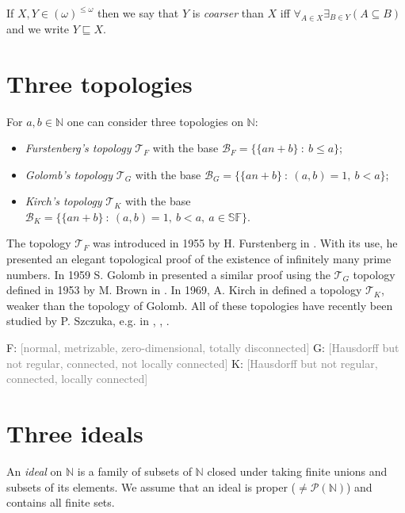 \documentclass{amsart}
\theoremstyle{definition}
\theoremstyle{definition}
\newcommand{\N}{{\mathbb N}}
\newcommand{\Z}{{\mathbb Z}}
\newcommand{\T}{\mathcal{T}}
\newcommand{\SqrFr}{\mathbb{SF}}
\newcommand{\Partitions}{(\omega)^{\leq \omega}}
\begin{document}
 If $X, Y \in \Partitions$ then we say that $Y$ is
{\it coarser} than $X$ iff
  $\forall_{A \in X} \exists_{B \in Y} (A \subseteq B)$
and we write $Y \sqsubseteq X$.



\section*{Three topologies}

For $a,b\in\N$ one can consider three topologies on $\N$:
\begin{itemize}
\item \emph{Furstenberg's topology} $\T_F$ with the base $\mathcal{B}_F = \{\{an+b\}\ :\ b\leq a\}$;
\item \emph{Golomb's topology} $\T_G$ with the base $\mathcal{B}_G = \{\{an+b\}\ :\ (a,b)=1,\ b<a\}$;
\item \emph{Kirch's topology} $\T_K$ with the base $\mathcal{B}_K = \{\{an+b\}\ :\ (a,b)=1,\ b<a,\ a\in\SqrFr\}$.
\end{itemize}

The topology $\T_F$ was introduced in 1955 by H. Furstenberg in \cite{F}. With its use, he presented an elegant topological proof of the existence of infinitely many prime numbers. In 1959 S. Golomb in \cite{G} presented a similar proof using the $\T_G$ topology defined in 1953 by M. Brown in \cite{B}. In 1969, A. Kirch in \cite{K} defined a topology $\T_K$, weaker than the topology of Golomb. All of these topologies have recently been studied by P. Szczuka, e.g. in \cite{Szczuka1}, \cite{Szczuka2}, \cite{Szczuka3}.

F: \textcolor{gray}{\scriptsize{[normal, metrizable, zero-dimensional, totally disconnected]}}
G: \textcolor{gray}{\scriptsize{[Hausdorff but not regular, connected, not locally connected]}}
K: \textcolor{gray}{\scriptsize{[Hausdorff but not regular, connected, locally connected]}}


\section*{Three ideals}

An \emph{ideal} on $\N$ is a family of subsets of $\N$ closed under taking finite unions and subsets of its elements. We assume that an ideal is proper ($\neq \mathcal{P}(\N)$) and contains all finite sets.
\end{document}
